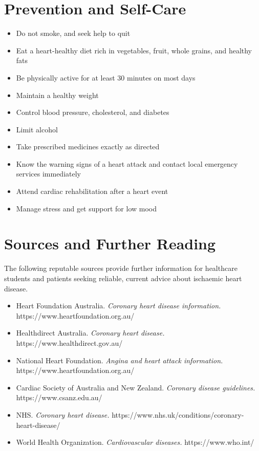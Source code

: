 \section*{Prevention and Self-Care}
\begin{itemize}
    \item Do not smoke, and seek help to quit
    \item Eat a heart-healthy diet rich in vegetables, fruit, whole grains, and healthy fats
    \item Be physically active for at least 30 minutes on most days
    \item Maintain a healthy weight
    \item Control blood pressure, cholesterol, and diabetes
    \item Limit alcohol
    \item Take prescribed medicines exactly as directed
    \item Know the warning signs of a heart attack and contact local emergency services immediately
    \item Attend cardiac rehabilitation after a heart event
    \item Manage stress and get support for low mood
\end{itemize}

\section*{Sources and Further Reading}
The following reputable sources provide further information for healthcare students and patients seeking reliable, current advice about ischaemic heart disease.
\begin{itemize}
    \item Heart Foundation Australia. \textit{Coronary heart disease information.} https://www.heartfoundation.org.au/
    \item Healthdirect Australia. \textit{Coronary heart disease.} https://www.healthdirect.gov.au/
    \item National Heart Foundation. \textit{Angina and heart attack information.} https://www.heartfoundation.org.au/
    \item Cardiac Society of Australia and New Zealand. \textit{Coronary disease guidelines.} https://www.csanz.edu.au/
    \item NHS. \textit{Coronary heart disease.} https://www.nhs.uk/conditions/coronary-heart-disease/
    \item World Health Organization. \textit{Cardiovascular diseases.} https://www.who.int/
\end{itemize}
